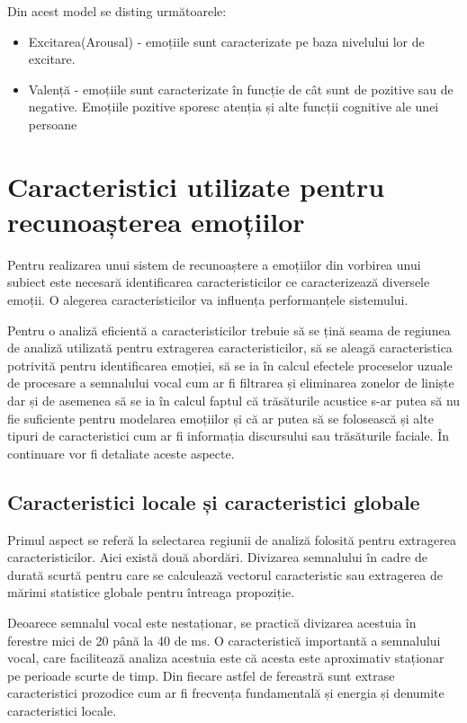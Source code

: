 \documentclass[9pt,shortpaper,twoside,web]{ieeecolor}
\begin{document}
Din acest model se disting următoarele:

\begin{itemize}
\item Excitarea(Arousal) - emoțiile sunt caracterizate pe baza nivelului lor de excitare. 

\item Valență - emoțiile sunt caracterizate în funcție de cât sunt de pozitive sau de negative. Emoțiile pozitive sporesc atenția și alte funcții cognitive ale unei persoane
\end{itemize}


\section{Caracteristici utilizate pentru recunoașterea emoțiilor}
Pentru realizarea unui sistem de recunoaștere a emoțiilor din vorbirea unui subiect este necesară identificarea caracteristicilor ce caracterizează diversele emoții. O alegerea caracteristicilor va influența performanțele sistemului.

Pentru o analiză eficientă a caracteristicilor trebuie să se țină seama de regiunea de analiză utilizată pentru extragerea caracteristicilor, să se aleagă caracteristica potrivită pentru identificarea emoției, să se ia în calcul efectele proceselor uzuale de procesare a semnalului vocal cum ar fi filtrarea și eliminarea zonelor de liniște dar și de asemenea să se ia în calcul faptul că trăsăturile acustice s-ar putea să nu fie suficiente pentru modelarea emoțiilor și că ar putea să se folosească și alte tipuri de caracteristici cum ar fi informația discursului sau trăsăturile faciale. În continuare vor fi detaliate aceste aspecte.


\subsection{Caracteristici locale și caracteristici globale}
Primul aspect se referă la selectarea regiunii de analiză folosită pentru extragerea caracteristicilor. Aici există două abordări. Divizarea semnalului în cadre de durată scurtă pentru care se calculează vectorul caracteristic sau extragerea de mărimi statistice globale pentru întreaga propoziție. 

Deoarece semnalul vocal este nestaționar, se practică divizarea acestuia în ferestre mici de 20 până la 40 de ms. O caracteristică importantă a semnalului vocal, care facilitează analiza acestuia este că acesta este aproximativ staționar pe perioade scurte de timp. Din fiecare astfel de fereastră sunt extrase caracteristici prozodice cum ar fi frecvența fundamentală și energia și denumite caracteristici locale. 
\end{document}
